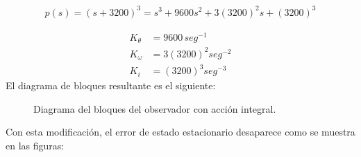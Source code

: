 \documentclass[a4paper, 10pt, onecolumn,journal]{ieeeconf}
\begin{document}
\begin{align}
	p(s) = \left( s + 3200\right) ^3 = s^3 + 9600 s^2 + 3(3200)^2 s + (3200)^3\label{polinomeo caracteristico de observador nuevo deseado}
\end{align}

\begin{align}
	K_{\theta} &= 9600 \, seg^{-1} \label{ganacia de posicion de observador nuevo}\\
	K_{\omega} &= 3(3200)^2 seg^{-2} \label{ganacia de velocidad de observador nuevo}\\
	K_{i} &= (3200)^3 seg^{-3} \label{ganacia integral de observador nuevo}
\end{align}
El diagrama de bloques resultante es el siguiente:
\begin{figure}[H]
	\centering
	\begin{adjustbox}{scale=0.5,max width=\columnwidth}
	\end{adjustbox}
	\caption{Diagrama del bloques del observador con acción integral.}
	\label{Diagrama del bloques del observador con acción integrale}
\end{figure}
Con esta modificación, el error de estado estacionario desaparece como se muestra en las figuras:
\end{document}
